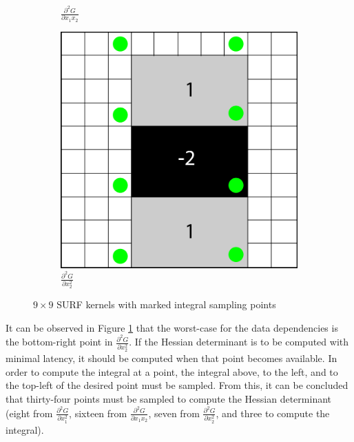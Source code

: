 \documentclass[sigconf]{acmart}
\begin{document}
\begin{figure}[h]
\begin{subfigure}[b]{0.3\columnwidth}
		\caption{$\frac{\partial^2 G}{\partial x_1 x_2}$}
	\end{subfigure}
	\begin{subfigure}[b]{0.3\columnwidth}
		\centering
		\includegraphics[width=\columnwidth]{figures/hessian/gaussian_second_order_kernel_yy_integral}
		\caption{$\frac{\partial^2 G}{\partial x_2^2}$}
	\end{subfigure}
	\caption{$9 \times 9$ SURF kernels with marked integral sampling points}
	\label{fig_gaussian_integral_kernels}
\end{figure}

It can be observed in Figure \ref{fig_gaussian_integral_kernels} that the worst-case for the data dependencies is the bottom-right point in $\frac{\partial^2 G}{\partial x_2^2}$. If the Hessian determinant is to be computed with minimal latency, it should be computed when that point becomes available. In order to compute the integral at a point, the integral above, to the left, and to the top-left of the desired point must be sampled. From this, it can be concluded that thirty-four points must be sampled to compute the Hessian determinant (eight from $\frac{\partial^2 G}{\partial x_1^2}$, sixteen from $\frac{\partial^2 G}{\partial x_1 x_2}$, seven from $\frac{\partial^2 G}{\partial x_2^2}$, and three to compute the integral). 
\end{document}
